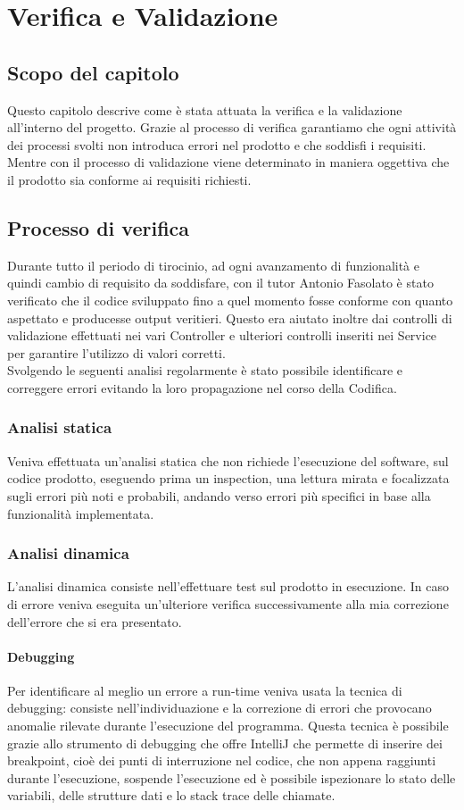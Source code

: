 \chapter{Verifica e Validazione}
\label{cap:verifica-validazione}
\section{Scopo del capitolo}
Questo capitolo descrive come è stata attuata la verifica e la validazione all'interno del progetto. Grazie al processo di verifica garantiamo che ogni attività dei processi svolti non introduca errori nel prodotto e che soddisfi i requisiti. Mentre con il processo di validazione viene determinato in maniera oggettiva che il prodotto sia conforme ai requisiti richiesti.
\section{Processo di verifica}
Durante tutto il periodo di tirocinio, ad ogni avanzamento di funzionalità e quindi cambio di requisito da soddisfare, con il tutor Antonio Fasolato è stato verificato che il codice sviluppato fino a quel momento fosse conforme con quanto aspettato e producesse output veritieri. Questo era aiutato inoltre dai controlli di validazione effettuati nei vari Controller e ulteriori controlli inseriti nei Service per garantire l’utilizzo di valori corretti.\\
Svolgendo le seguenti analisi regolarmente è stato possibile identificare e correggere errori evitando la loro propagazione nel corso della Codifica.
\subsection{Analisi statica}
Veniva effettuata un’analisi statica che non richiede l'esecuzione del software, sul codice prodotto, eseguendo prima un inspection, una lettura mirata e focalizzata sugli errori più noti e probabili, andando verso errori più specifici in base alla funzionalità implementata.
\subsection{Analisi dinamica}
L'analisi dinamica consiste nell'effettuare test sul prodotto in esecuzione. In caso di errore veniva eseguita un’ulteriore verifica successivamente alla mia correzione dell’errore che si era presentato.\\
\subsubsection{Debugging}
Per identificare al meglio un errore a run-time veniva usata la tecnica di debugging: consiste nell'individuazione e la correzione di errori che provocano anomalie rilevate durante l'esecuzione del programma. Questa tecnica è possibile grazie allo strumento di debugging che offre IntelliJ che permette di inserire dei breakpoint, cioè dei punti di interruzione nel codice, che non appena raggiunti durante l'esecuzione, sospende l'esecuzione ed è possibile ispezionare lo stato delle variabili, delle strutture dati e lo stack trace delle chiamate.\\ 
